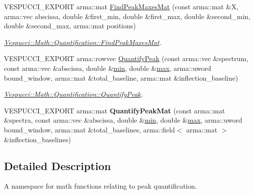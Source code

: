 \begin{DoxyCompactItemize}
V\+E\+S\+P\+U\+C\+C\+I\+\_\+\+E\+X\+P\+O\+RT arma\+::mat \hyperlink{namespace_vespucci_1_1_math_1_1_quantification_a6b4ad9737e416fb31ffc736465c3e87d}{Find\+Peak\+Maxes\+Mat} (const arma\+::mat \&X, arma\+::vec abscissa, double \&first\+\_\+min, double \&first\+\_\+max, double \&second\+\_\+min, double \&second\+\_\+max, arma\+::mat positions)
\begin{DoxyCompactList}\small\item\em \hyperlink{namespace_vespucci_1_1_math_1_1_quantification_a6b4ad9737e416fb31ffc736465c3e87d}{Vespucci\+::\+Math\+::\+Quantification\+::\+Find\+Peak\+Maxes\+Mat}. \end{DoxyCompactList}\item 
V\+E\+S\+P\+U\+C\+C\+I\+\_\+\+E\+X\+P\+O\+RT arma\+::rowvec \hyperlink{namespace_vespucci_1_1_math_1_1_quantification_a31511f6ba7a9941be61755d856b957fd}{Quantify\+Peak} (const arma\+::vec \&spectrum, const arma\+::vec \&abscissa, double \&\hyperlink{namespace_vespucci_1_1_math_a884dc00603c6aed8e2ee23988c429c64}{min}, double \&\hyperlink{namespace_vespucci_1_1_math_a3d8f536b4465a4bacce89a51e3854daf}{max}, arma\+::uword bound\+\_\+window, arma\+::mat \&total\+\_\+baseline, arma\+::mat \&inflection\+\_\+baseline)
\begin{DoxyCompactList}\small\item\em \hyperlink{namespace_vespucci_1_1_math_1_1_quantification_a31511f6ba7a9941be61755d856b957fd}{Vespucci\+::\+Math\+::\+Quantification\+::\+Quantify\+Peak}. \end{DoxyCompactList}\item 
V\+E\+S\+P\+U\+C\+C\+I\+\_\+\+E\+X\+P\+O\+RT arma\+::mat {\bfseries Quantify\+Peak\+Mat} (const arma\+::mat \&spectra, const arma\+::vec \&abscissa, double \&\hyperlink{namespace_vespucci_1_1_math_a884dc00603c6aed8e2ee23988c429c64}{min}, double \&\hyperlink{namespace_vespucci_1_1_math_a3d8f536b4465a4bacce89a51e3854daf}{max}, arma\+::uword bound\+\_\+window, arma\+::mat \&total\+\_\+baselines, arma\+::field$<$ arma\+::mat $>$ \&inflection\+\_\+baselines)\hypertarget{namespace_vespucci_1_1_math_1_1_quantification_ac35dfbbb87081896cda24666e6988ed4}{}\label{namespace_vespucci_1_1_math_1_1_quantification_ac35dfbbb87081896cda24666e6988ed4}

\end{DoxyCompactItemize}


\subsection{Detailed Description}
A namespace for math functions relating to peak quantification. 

